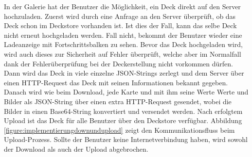 In der Galerie hat der Benutzer die Möglichkeit, ein Deck direkt auf den Server hochzuladen. Zuerst wird durch eine Anfrage an den Server überprüft, ob das Deck schon im Deckstore vorhanden ist. Ist dies der Fall, kann das selbe Deck nicht erneut hochgeladen werden. Fall nicht, bekommt der Benutzer wieder eine Ladeanzeige mit Fortschrittsbalken zu sehen. Bevor das Deck hochgeladen wird, wird auch dieses zur Sicherheit auf Fehler überprüft, welche aber im Normalfall dank der Fehlerüberprüfung bei der Deckerstellung nicht vorkommen dürfen. Dann wird das Deck in viele einzelne JSON-Strings zerlegt und dem Server über einen HTTP-Request das Deck mit seinen Informationen bekannt gegeben. Danach wird wie beim Download, jede Karte und mit ihm seine Werte Werte und Bilder als JSON-String über einen extra HTTP-Request gesendet, wobei die Bilder in einen Base64-String konvertiert und versendet werden. Nach erfolgtem Upload ist das Deck für alle Benutzer über den Deckstore verfügbar. Abbildung \ref{figure:implementierungdownundupload} zeigt den Kommunikationsfluss beim Upload-Prozess. Sollte der Benutzer keine Internetverbindung haben, wird sowohl der Download als auch der Upload abgebrochen.
\newpage

